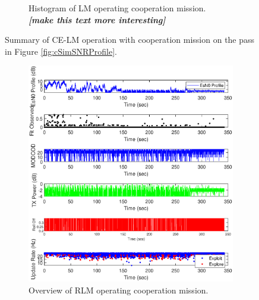 \begin{figure}[ht]
\begin{subfigure}{\linewidth}
	\caption{Histogram of LM operating cooperation mission. \textit{\textbf{[make this text more interesting]}}}
	\label{fig:cSimLMHists}
\end{subfigure}
\caption{Summary of CE-LM operation with cooperation mission on the pass in Figure \ref{fig:cSimSNRProfile}.}
\label{fig:c22LMCoop}
\end{figure}
\begin{figure}[ht]
\centering
\begin{subfigure}{\linewidth}
	\centering
	\includegraphics[scale=0.5]{figures/c_sim_results/sim22_RLM_overview_coop.eps}
	\caption{Overview of RLM operating cooperation mission.}
	\label{fig:cSimLMOverview}
\end{subfigure}\\
\begin{subfigure}{\linewidth}
	\centering

\end{subfigure}
\end{figure}
